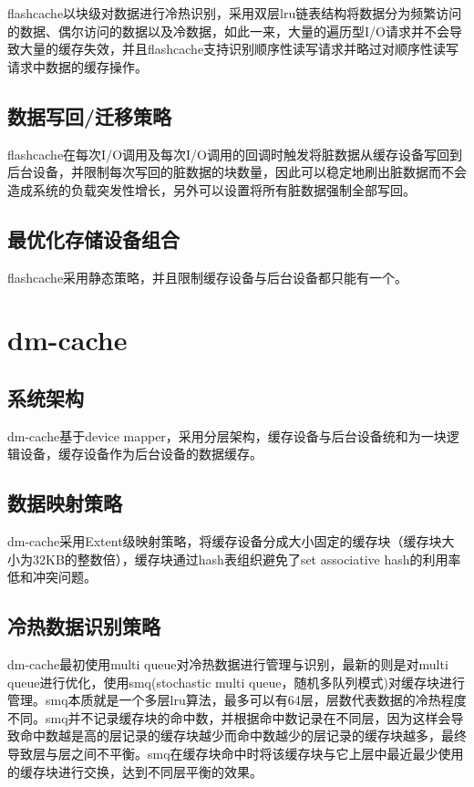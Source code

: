 flashcache以块级对数据进行冷热识别，采用双层lru链表结构将数据分为频繁访问的数据、偶尔访问的数据以及冷数据，如此一来，大量的遍历型I/O请求并不会导致大量的缓存失效，并且flashcache支持识别顺序性读写请求并略过对顺序性读写请求中数据的缓存操作。

\subsection{数据写回/迁移策略}

flashcache在每次I/O调用及每次I/O调用的回调时触发将脏数据从缓存设备写回到后台设备，并限制每次写回的脏数据的块数量，因此可以稳定地刷出脏数据而不会造成系统的负载突发性增长，另外可以设置将所有脏数据强制全部写回。

\subsection{最优化存储设备组合}

flashcache采用静态策略，并且限制缓存设备与后台设备都只能有一个。

\section{dm-cache}

\subsection{系统架构}

dm-cache基于device mapper，采用分层架构，缓存设备与后台设备统和为一块逻辑设备，缓存设备作为后台设备的数据缓存。

\subsection{数据映射策略}

dm-cache采用Extent级映射策略，将缓存设备分成大小固定的缓存块（缓存块大小为32KB的整数倍），缓存块通过hash表组织避免了set associative hash的利用率低和冲突问题。

\subsection{冷热数据识别策略}

dm-cache最初使用multi queue对冷热数据进行管理与识别，最新的则是对multi queue进行优化，使用smq(stochastic multi queue，随机多队列模式)对缓存块进行管理。smq本质就是一个多层lru算法，最多可以有64层，层数代表数据的冷热程度不同。smq并不记录缓存块的命中数，并根据命中数记录在不同层，因为这样会导致命中数越是高的层记录的缓存块越少而命中数越少的层记录的缓存块越多，最终导致层与层之间不平衡。smq在缓存块命中时将该缓存块与它上层中最近最少使用的缓存块进行交换，达到不同层平衡的效果。

